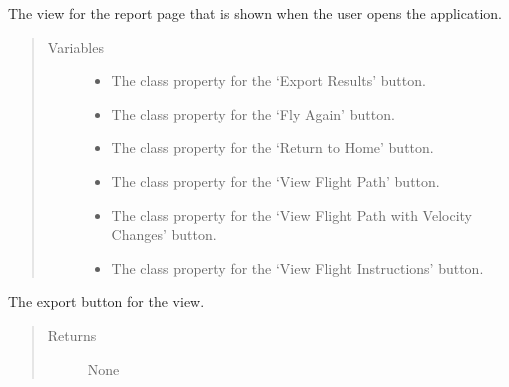\documentclass[letterpaper,10pt,english]{sphinxmanual}
\begin{document}
\begin{fulllineitems}
\label{\detokenize{index:src.Views.View_ReportScreen.ReportWindow}}
The view for the report page that is shown when the user opens the application.
\begin{quote}\begin{description}
\item[{Variables}] \leavevmode\begin{itemize}
\item {} 
 \textendash{} The class property for the ‘Export Results’ button.

\item {} 
 \textendash{} The class property for the ‘Fly Again’ button.

\item {} 
 \textendash{} The class property for the ‘Return to Home’ button.

\item {} 
 \textendash{} The class property for the ‘View Flight Path’ button.

\item {} 
 \textendash{} The class property for the ‘View Flight Path with Velocity Changes’ button.

\item {} 
 \textendash{} The class property for the ‘View Flight Instructions’ button.

\end{itemize}

\end{description}\end{quote}

\begin{fulllineitems}
\label{\detokenize{index:src.Views.View_ReportScreen.ReportWindow.BtnExport}}
The export button for the view.
\begin{quote}\begin{description}
\item[{Returns}] \leavevmode
None


\end{description}
\end{quote}
\end{fulllineitems}
\end{fulllineitems}
\end{document}
